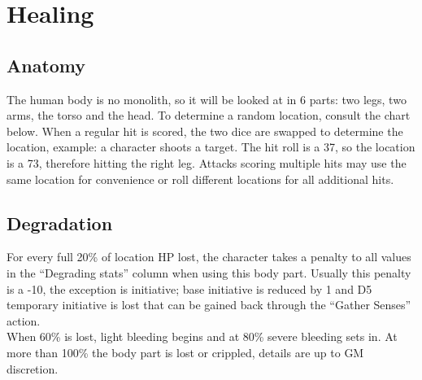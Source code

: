 \documentclass[12pt,a4paper,openany]{book}
\begin{document}
	\chapter{Healing}
	\section{Anatomy}
	The human body is no monolith, so it will be looked at in 6 parts: two legs, two arms, the torso and the head. To determine a random location, consult the chart below. When a regular hit is scored, the two dice are swapped to determine the location, example: a character shoots a target. The hit roll is a 37, so the location is a 73, therefore hitting the right leg. Attacks scoring multiple hits may use the same location for convenience or roll different locations for all additional hits.
	\section{Degradation}
	For every full 20\% of location HP lost, the character takes a penalty to all values in the “Degrading stats” column when using this body part. Usually this penalty is a -10, the exception is initiative; base initiative is reduced by 1 and D5 temporary initiative is lost that can be gained back through the “Gather Senses” action.\\
	When 60\% is lost, light bleeding begins and at 80\% severe bleeding sets in. At more than 100\% the body part is lost or crippled, details are up to GM discretion.
\end{document}
